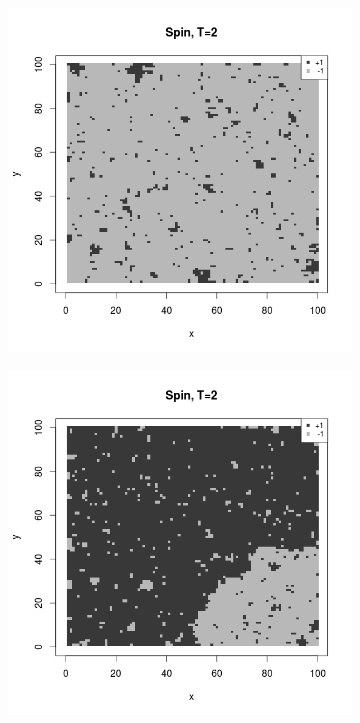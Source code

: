 \documentclass{scrartcl}
\begin{document}
\begin{figure}[ht]
\begin{subfigure}{.35\textwidth}
\end{subfigure}%
\begin{subfigure}{.35\textwidth}
  \centering
  \includegraphics[width=1\linewidth]{spins/spinT2-}
\end{subfigure}%
\begin{subfigure}{.35\textwidth}
  \centering
  \includegraphics[width=1\linewidth]{spins/spinT2doms}

\end{subfigure}
\end{figure}
\end{document}
